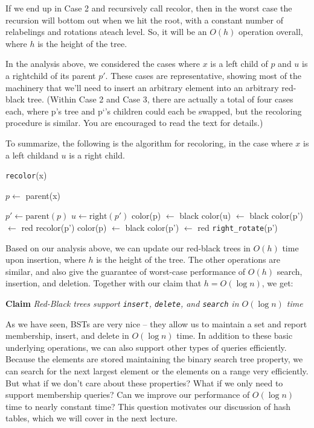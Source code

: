 \documentclass [12pt]{article}
\begin{document}
If we end up in Case 2 and recursively call recolor, then in the worst case the recursion will bottom out when we hit the root, with a constant number of relabelings and rotations ateach level. So, it will be an $O(h)$ operation overall, where $h$ is the height of the tree.

In the analysis above, we considered the cases where $x$ is a left child of $p$ and $u$ is a rightchild of its parent $p'$. These cases are representative, showing most of the machinery that we’ll need to insert an arbitrary element into an arbitrary red-black tree. (Within Case 2 and Case 3, there are actually a total of four cases each, where p's tree and p`'s children could each be swapped, but the recoloring procedure is similar. You are encouraged to read the text for details.)

To summarize, the following is the algorithm for recoloring, in the case where $x$ is a left childand $u$ is a right child.

\begin{algorithm}
\caption{\texttt{recolor}(x)}\label{alg:recolor_rb}
\begin{algorithmic}
\STATE $p \gets $ parent(x)
  \RETURN
\ENDIF

\STATE $p' \gets \text{parent}(p)$
\STATE $u \gets \text{right}(p')$
  \STATE color(p) $\gets $ black
  \STATE color(u) $\gets $ black
  \STATE color(p') $\gets $ red
  \STATE recolor(p')
  \STATE color(p) $\gets $ black
  \STATE color(p') $\gets $ red
  \STATE \texttt{right\_rotate}(p')
\ENDIF
\end{algorithmic}
\end{algorithm}

Based on our analysis above, we can update our red-black trees in $O(h)$ time upon insertion, where $h$ is the height of the tree. The other operations are similar, and also give the guarantee of worst-case performance of $O(h)$ search, insertion, and deletion. Together with our claim that $h = O(\log n)$, we get:

\textbf{Claim} \textit{Red-Black trees support \texttt{insert}, \texttt{delete}, and \texttt{search} in $O(\log n)$ time}

As we have seen, BSTs are very nice – they allow us to maintain a set and report membership, insert, and delete in $O(\log n)$ time. In addition to these basic underlying operations, we can also support other types of queries efficiently. Because the elements are stored maintaining the binary search tree property, we can search for the next largest element or the elements on a range very efficiently. But what if we don’t care about these properties? What if we only need to support membership queries? Can we improve our performance of $O(\log n)$ time to nearly constant time? This question motivates our discussion of hash tables, which we will cover in the next lecture.
\end{document}
